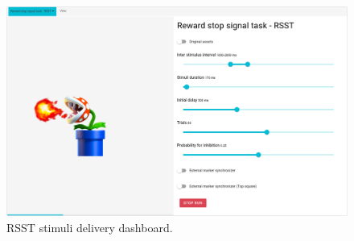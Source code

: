 \begin{figure}[H]
\begin{centering}
% 
\includegraphics[width=1\textwidth]{Appendix/paradigms/Figures/rsst-delivery.png}
\par\end{centering}
\caption{\gls*{RSST} stimuli delivery dashboard.}
\label{}
\end{figure}